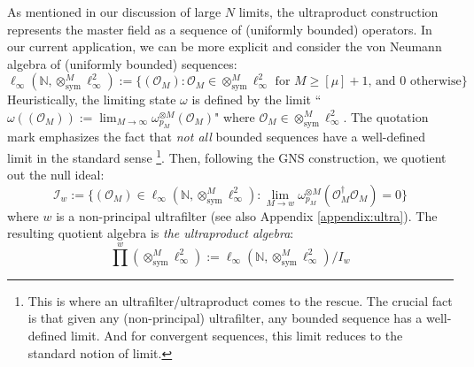 \documentclass[a4paper,11pt]{article}
\theoremstyle{definition}
\numberwithin{equation}{section}
\begin{document}
As mentioned in our discussion of large $N$ limits, the ultraproduct construction represents the master field as a sequence of (uniformly bounded) operators. In our current application, we can be more explicit and consider the von Neumann algebra of (uniformly bounded) sequences:
\begin{equation}
    \ell_\infty(\mathbb{N}, \otimes_\text{sym}^M\ell_\infty^2) := \{(\mathcal{O}_M):\mathcal{O}_M\in\otimes_\text{sym}^M\ell_\infty^2\text{ for }M\geq [\mu]+1\text{, and }0\text{ otherwise}\}
\end{equation}
Heuristically, the limiting state $\omega$ is defined by the limit ``$\omega((\mathcal{O}_M)) := \lim_{M\rightarrow\infty}\omega_{p_M}^{\otimes M}(\mathcal{O}_M)$" where $\mathcal{O}_M\in\otimes_\text{sym}^M\ell_\infty^2$. The quotation mark emphasizes the fact that \textit{not all} bounded sequences have a well-defined limit in the standard sense \footnote{This is where an ultrafilter/ultraproduct comes to the rescue. The crucial fact is that given any (non-principal) ultrafilter, any bounded sequence has a well-defined limit. And for convergent sequences, this limit reduces to the standard notion of limit.}. Then, following the GNS construction, we quotient out the null ideal:
\begin{equation}
    \mathcal{I}_w := \{(\mathcal{O}_M)\in\ell_\infty(\mathbb{N},\otimes_\text{sym}^M\ell_\infty^2): \lim_{M\rightarrow w}\omega_{p_M}^{\otimes M}(\mathcal{O}_M^\dagger\mathcal{O}_M) = 0\}
\end{equation}
where $w$ is a non-principal ultrafilter (see also Appendix \ref{appendix:ultra}).
The resulting quotient algebra is \textit{the ultraproduct algebra}:
\begin{equation}
    \prod^w (\otimes_\text{sym}^M\ell_\infty^2) := \ell_\infty(\mathbb{N}, \otimes_\text{sym}^M\ell_\infty^2) / I_w
\end{equation}
\end{document}
